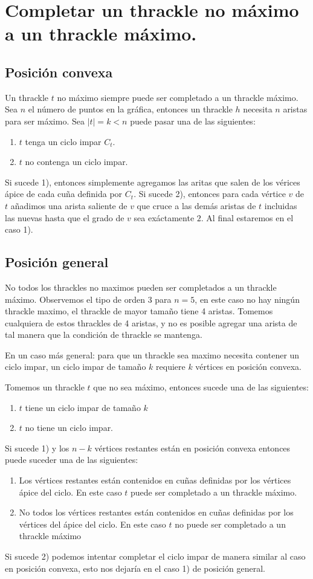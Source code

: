 \documentclass[12pt, letterpaper]{article}
\begin{document}
\section{Completar un thrackle no máximo a un thrackle máximo.}
\subsection{Posición convexa}
Un thrackle $t$ no máximo siempre puede ser completado a un thrackle máximo.
Sea $n$ el número de puntos en la gráfica, entonces un thrackle $h$ necesita $n$ aristas para ser máximo.
Sea $|t| = k < n$ puede pasar una de las siguientes:
\begin{enumerate}
  \item $t$ tenga un ciclo impar $C_t$.
  \item $t$ no contenga un ciclo impar.
\end{enumerate}

Si sucede 1), entonces simplemente agregamos las aritas que salen de los vérices ápice de cada cuña definida por $C_t$.
Si sucede 2), entonces para cada vértice $v$ de $t$ añadimos una arista saliente de $v$ que cruce a las demás aristas de $t$ incluidas
las nuevas hasta que el grado de $v$ sea exáctamente $2$. Al final estaremos en el caso 1).

\subsection{Posición general}
No todos los thrackles no maximos pueden ser completados a un thrackle máximo.
Observemos el tipo de orden 3 para $n=5$, en este caso no hay ningún thrackle maximo, el thrackle de mayor tamaño tiene 4 aristas.
Tomemos cualquiera de estos thrackles de 4 aristas, y no es posible agregar una arista de tal manera que la condición de thrackle se
mantenga.

En un caso más general: para que un thrackle sea maximo necesita contener un ciclo impar, un ciclo impar de tamaño $k$ requiere $k$
vértices en posición convexa.

Tomemos un thrackle $t$ que no sea máximo, entonces sucede una de las siguientes:
\begin{enumerate}
  \item $t$ tiene un ciclo impar de tamaño $k$
  \item $t$ no tiene un ciclo impar.
\end{enumerate}
Si sucede 1) y los $n-k$ vértices restantes están en posición convexa entonces puede suceder una de las siguientes:
\begin{enumerate}
  \item Los vértices restantes están contenidos en cuñas definidas por los vértices ápice del ciclo. En este caso $t$ puede ser
  completado a un thrackle máximo.
  \item No todos los vértices restantes están contenidos en cuñas definidas por los vértices del ápice del ciclo. En este caso $t$ no
  puede ser completado a un thrackle máximo
\end{enumerate}
Si sucede 2) podemos intentar completar el ciclo impar de manera similar al caso en posición convexa, esto nos dejaría en el caso 1) de posición general.
\end{document}
